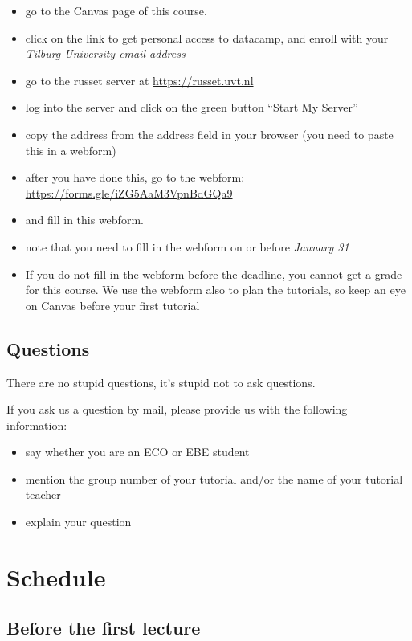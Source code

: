 \documentclass[]{book}
\providecommand{\tightlist}{%
  \setlength{\itemsep}{0pt}\setlength{\parskip}{0pt}}
\begin{document}
\begin{itemize}
\tightlist
\item
  go to the Canvas page of this course.
\item
  click on the link to get personal access to datacamp, and enroll with your \emph{Tilburg University email address}
\item
  go to the russet server at \url{https://russet.uvt.nl}
\item
  log into the server and click on the green button ``Start My Server''
\item
  copy the address from the address field in your browser (you need to paste this in a webform)
\item
  after you have done this, go to the webform: \url{https://forms.gle/iZG5AaM3VpnBdGQa9}
\item
  and fill in this webform.
\item
  note that you need to fill in the webform on or before \emph{January 31}
\item
  If you do not fill in the webform before the deadline, you cannot get a grade for this course. We use the webform also to plan the tutorials, so keep an eye on Canvas before your first tutorial
\end{itemize}

\hypertarget{questions}{%
\section{Questions}\label{questions}}

There are no stupid questions, it's stupid not to ask questions.

If you ask us a question by mail, please provide us with the following information:

\begin{itemize}
\tightlist
\item
  say whether you are an ECO or EBE student
\item
  mention the group number of your tutorial and/or the name of your tutorial teacher
\item
  explain your question
\end{itemize}

\hypertarget{schedule}{%
\chapter{Schedule}\label{schedule}}

\hypertarget{before-the-first-lecture}{%
\section{Before the first lecture}\label{before-the-first-lecture}}
\end{document}
